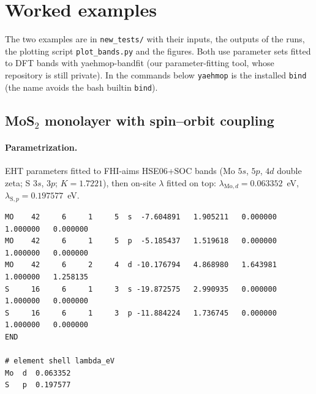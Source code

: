 \documentclass[11pt,a4paper]{article}
\newcommand{\file}[1]{\texttt{#1}}
\begin{document}
\section{Worked examples}\label{sec:examples}

The two examples are in \file{new\_tests/} with their inputs, the outputs of the runs,
the plotting script \file{plot\_bands.py} and the figures. Both use parameter sets fitted
to DFT bands with yaehmop-bandfit (our parameter-fitting tool, whose repository is still
private).
In the commands below \texttt{yaehmop} is the installed \texttt{bind} (the name avoids the
bash builtin \texttt{bind}).

\subsection{MoS$_2$ monolayer with spin--orbit coupling}

\paragraph{Parametrization.} EHT parameters fitted to FHI-aims HSE06+SOC bands (Mo $5s$,
$5p$, $4d$ double zeta; S $3s$, $3p$; $K=1.7221$), then on-site $\lambda$ fitted on top:
$\lambda_{\mathrm{Mo},d}=0.063352$~eV, $\lambda_{\mathrm{S},p}=0.197577$~eV.

\begin{lstlisting}[style=sh,caption={\file{new\_tests/MoS2\_SOC/MoS2\_params.dat} and \file{MoS2\_soc.dat}}]
MO    42     6     1     5  s  -7.604891   1.905211   0.000000   1.000000   0.000000
MO    42     6     1     5  p  -5.185437   1.519618   0.000000   1.000000   0.000000
MO    42     6     2     4  d -10.176794   4.868980   1.643981   1.000000   1.258135
S     16     6     1     3  s -19.872575   2.990935   0.000000   1.000000   0.000000
S     16     6     1     3  p -11.884224   1.736745   0.000000   1.000000   0.000000
END

# element shell lambda_eV
Mo  d  0.063352
S   p  0.197577
\end{lstlisting}
\end{document}
